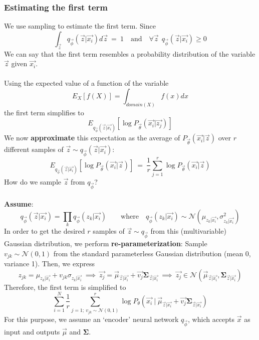 \documentclass[a4paper]{article}
\begin{document}
\subsubsection{Estimating the first term}
We use sampling to estimate the first term.
Since 
$$
\int_{\vec{z}} q_{\vec{\phi}}(\vec{z} | \vec{x_i}) d\vec{z}\ =\ 1 
\quad \text{and} \quad
\forall \vec{z} \ \ q_{\vec{\phi}}(\vec{z} | \vec{x_i}) \geq 0
$$
We can say that the first term resembles a probability distribution of the variable $\vec{z}$ given $\vec{x_i}$. \\ \\
Using the expected value of a function of the variable
$$E_{X}[f(X)] = \int_{domain(X)} f(x) dx $$ 
the first term simplifies to 
$$
    E_{q_{\vec{\phi}} (\vec{z} | \vec{x_i})}\left[\log P_{\vec{\theta}} (\vec{x_i} | \vec{z_j}) \right]
$$
We now \textbf{approximate} this expectation as the average of $P_{\vec{\theta}}(\vec{x_i} | \vec{z}) $ over $r$ different samples of $\vec{z} \sim q_{\vec{\phi}}(\vec{z} | \vec{x_i})$: \[
E_{q_{\vec{\phi}} (\vec{z} | \vec{x_i})}\left[\log P_{\vec{\theta}} (\vec{x_i} | \vec{z}) \right]\ =\ 
\frac{1}{r}\sum_{j=1}^{r} \log P_{\vec{\theta}}(\vec{x_i} | \vec{z})
\]
How do we sample $\vec{z}$ from $q_{\vec{\phi}}$? \\ \\
\textbf{Assume}:  
\[
    q_{\vec{\phi}}(\vec{z} | \vec{x_i}) = \prod_{k} q_{\vec{\phi}}(z_k | \vec{x_i}) \quad \quad \text{where} \quad q_{\vec{\phi}}(z_k | \vec{x_i}) \sim \mathcal{N}\left(\mu_{z_k|\vec{x_i}}, \sigma^2_{z_k|\vec{x_i}} \right)
\] 
In order to get the desired $r$ samples of $\vec{z} \sim q_{\vec{\phi}}$ from this (multivariable) Gaussian distribution, we perform \textbf{re-parameterization}: Sample $v_{jk} \sim \mathcal{N}(0, 1)$ from the standard parameterless Gaussian distribution (mean 0, variance 1). Then, we express 
\[
    z_{jk} = \mu_{z_k |\vec{x_i}} + v_{jk}\sigma_{z_k |\vec{x_i}}\ \implies\ 
    \vec{z_j} = \vec{\mu}_{\vec{z} | \vec{x_i}} + \vec{v_j}\mathbf{\Sigma}_{\vec{z} | \vec{x_i}} \ \implies\
    \vec{z_j} \in \mathcal{N}\left(\vec{\mu}_{\vec{z}|\vec{x_i}}, \mathbf{\Sigma}_{\vec{z}|\vec{x_i}}\right) 
\]
Therefore, the first term is simplified to
\[
    \sum_{i=1}^N \frac{1}{r} \sum_{j=1;\ v_{jk} \sim \mathcal{N}(0,1)}^r \log P_{\theta}\left(
    \vec{x_i}\ |\ \vec{\mu}_{\vec{z} | \vec{x_i}} + \vec{v_j}\mathbf{\Sigma}_{\vec{z} | \vec{x_i}} \right)
\]
For this purpose, we assume an `encoder' neural network $q_{\vec{\phi}}$, which accepts $\vec{x}$ as input and outputs $\vec{\mu}$ and $\mathbf{\Sigma}$. 
\end{document}
